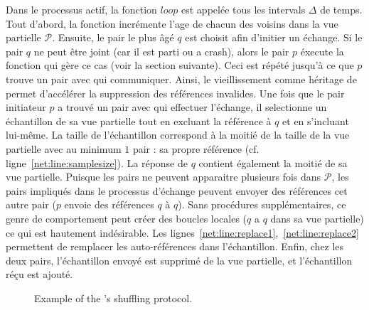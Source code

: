 Dans le processus actif, la fonction $loop$ est appelée tous les intervals
$\Delta$ de temps. Tout d'abord, la fonction incrémente l'age de chacun des
voisins dans la vue partielle $\mathcal{P}$. Ensuite, le pair le plus âgé $q$
est choisit afin d'initier un échange. Si le pair $q$ ne peut être joint (car il
est parti ou a crash), alors le pair $p$ éxecute la fonction qui gère ce cas
(voir la section suivante). Ceci est répété jusqu'à ce que $p$ trouve un pair
avec qui communiquer. Ainsi, le vieillissement comme héritage de \CYCLON permet
d'accélérer la suppression des références invalides. Une fois que le pair
initiateur $p$ a trouvé un pair avec qui effectuer l'échange, il selectionne un
échantillon de sa vue partielle tout en excluant la référence à $q$ et en
s'incluant lui-même. La taille de l'échantillon correspond à la moitié de la
taille de la vue partielle avec au minimum $1$ pair : sa propre référence
(cf. ligne~\ref{net:line:samplesize}). La réponse de $q$ contient également la moitié
de sa vue partielle. Puisque les pairs ne peuvent apparaitre plusieurs fois dans
$\mathcal{P}$, les pairs impliqués dans le processus d'échange peuvent envoyer
des références cet autre pair ($p$ envoie des références $q$ à $q$). Sans
procédures supplémentaires, ce genre de comportement peut créer des boucles
locales ($q$ a $q$ dans sa vue partielle) ce qui est hautement indésirable. Les
lignes~\ref{net:line:replace1},~\ref{net:line:replace2} permettent de remplacer les
auto-références dans l'échantillon. Enfin, chez les deux pairs, l'échantillon envoyé 
est supprimé de la vue partielle, et l'échantillon réçu est ajouté.

\begin{figure*}
  \centering
  \hspace{40pt}
  \hspace{10pt}
  \caption{\label{net:fig:cyclicexample}Example of the \SPRAY's shuffling
    protocol. }
\end{figure*}

